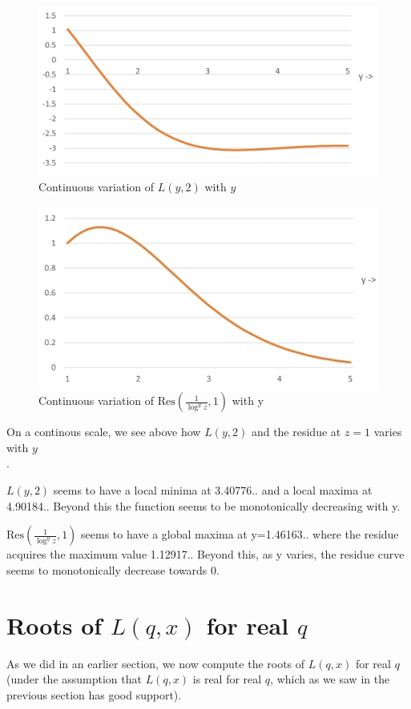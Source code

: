 \documentclass[a4paper,11pt,twoside]{amsart}
\newcommand\Res{\mathrm{Res}}
\begin{document}
\begin{figure}[H]
  \includegraphics[width=0.7\linewidth]{ly2_continuous.jpg}
  \caption{Continuous variation of $L(y,2)$ with $y$}
\end{figure}

\begin{figure}[H]
  \includegraphics[width=0.7\linewidth]{residue_curve.jpg}
  \caption{Continuous variation of $\Res(\frac{1}{\log^{y} z},1)$ with y}
\end{figure}

On a continous scale, we see above how $L(y,2)$ and the residue at $z=1$ varies with $y$\\. 

$L(y,2)$ seems to have a local minima at 3.40776.. and a local maxima at 4.90184.. Beyond this the function seems to be monotonically decreasing with y.

$\Res(\frac{1}{\log^{y} z},1)$ seems to have a global maxima at y=1.46163.. where the residue acquires the maximum value 1.12917.. Beyond this, as y varies, the residue curve seems to monotonically decrease towards 0.


\section{Roots of $L(q,x)$ for real $q$}

As we did in an earlier section, we now compute the roots of $L(q,x)$ for real $q$ (under the assumption that $L(q,x)$ is real for real $q$, which as we saw in the previous section has good support).
\end{document}
